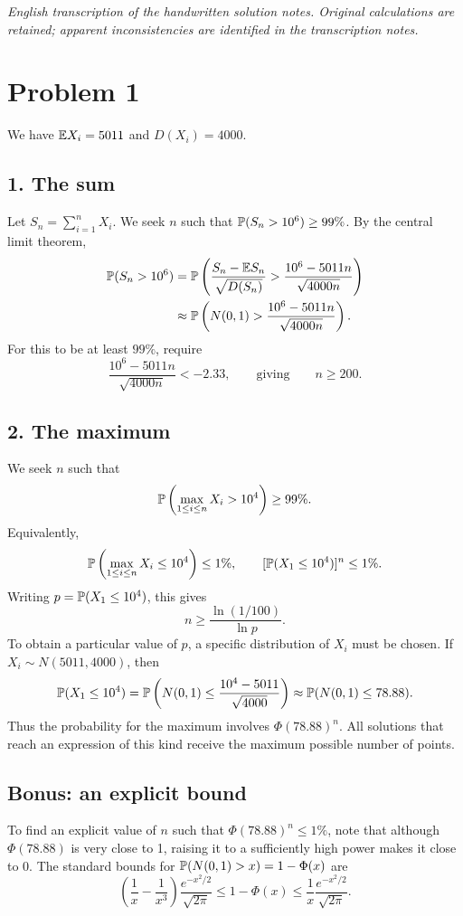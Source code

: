 \documentclass[11pt,a4paper]{article}
\begin{document}
\noindent\emph{English transcription of the handwritten solution notes. Original calculations are retained; apparent inconsistencies are identified in the transcription notes.}

\section*{Problem 1}
We have $\E X_i=5011$ and $D(X_i)=4000$.
\subsection*{1. The sum}
Let $S_n=\sum_{i=1}^nX_i$. We seek $n$ such that $\P(S_n>10^6)\ge99\%$. By the central limit theorem,
\begin{align*}
\P(S_n>10^6)
&=\P\left(\frac{S_n-\E S_n}{\sqrt{D(S_n)}}>
\frac{10^6-5011n}{\sqrt{4000n}}\right)\\
&\approx\P\left(N(0,1)>\frac{10^6-5011n}{\sqrt{4000n}}\right).
\end{align*}
For this to be at least $99\%$, require
\[
\frac{10^6-5011n}{\sqrt{4000n}}<-2.33,
\qquad\text{giving}\qquad n\ge200.
\]

\subsection*{2. The maximum}
We seek $n$ such that
\[
\P\left(\max_{1\le i\le n}X_i>10^4\right)\ge99\%.
\]
Equivalently,
\[
\P\left(\max_{1\le i\le n}X_i\le10^4\right)\le1\%,
\qquad [\P(X_1\le10^4)]^n\le1\%.
\]
Writing $p=\P(X_1\le10^4)$, this gives
\[
n\ge\frac{\ln(1/100)}{\ln p}.
\]
To obtain a particular value of $p$, a specific distribution of $X_i$ must be chosen. If $X_i\sim N(5011,4000)$, then
\[
\P(X_1\le10^4)=\P\left(N(0,1)\le\frac{10^4-5011}{\sqrt{4000}}\right)
\approx\P(N(0,1)\le78.88).
\]
Thus the probability for the maximum involves $\Phi(78.88)^n$.
All solutions that reach an expression of this kind receive the maximum possible number of points.

\subsection*{Bonus: an explicit bound}
To find an explicit value of $n$ such that $\Phi(78.88)^n\le1\%$, note that although $\Phi(78.88)$ is very close to 1, raising it to a sufficiently high power makes it close to 0.
The standard bounds for $\P(N(0,1)>x)=1-\Phi(x)$ are
\[
\left(\frac1x-\frac1{x^3}\right)\frac{e^{-x^2/2}}{\sqrt{2\pi}}
\le1-\Phi(x)\le\frac1x\frac{e^{-x^2/2}}{\sqrt{2\pi}}.
\]
\end{document}
